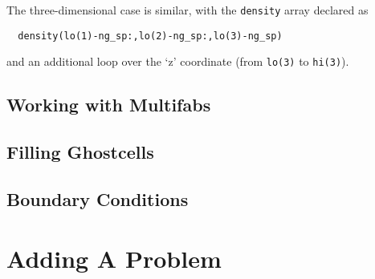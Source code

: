 The three-dimensional case is similar, with the {\tt density} array
declared as 
\begin{verbatim}
  density(lo(1)-ng_sp:,lo(2)-ng_sp:,lo(3)-ng_sp)
\end{verbatim}
and an additional loop over the `z' coordinate (from {\tt lo(3)} to
{\tt hi(3)}).

\subsection{Working with Multifabs}


\subsection{Filling Ghostcells}


\subsection{Boundary Conditions}



\section{Adding A Problem}




